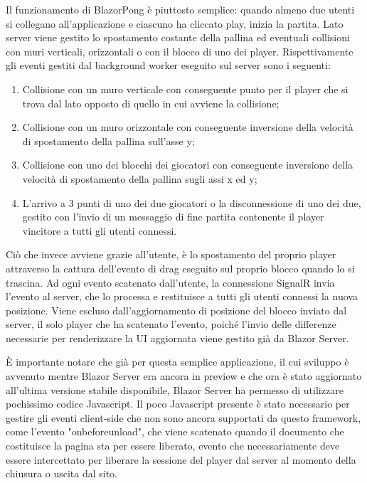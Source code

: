 Il funzionamento di BlazorPong \`e piuttosto semplice: quando almeno due utenti si collegano all'applicazione e ciascuno ha cliccato play, inizia la partita.
Lato server viene gestito lo spostamento costante della pallina ed eventuali collisioni con muri verticali, orizzontali o con il blocco di uno dei player.
Rispettivamente gli eventi gestiti dal background worker eseguito sul server sono i seguenti:
\begin{enumerate}
	\item Collisione con un muro verticale con conseguente punto per il player che si trova dal lato opposto di quello in cui avviene la collisione;
	\item Collisione con un muro orizzontale con conseguente inversione della velocit\`a di spostamento della pallina sull'asse y;
	\item Collisione con uno dei blocchi dei giocatori con conseguente inversione della velocit\`a di spostamento della pallina sugli assi x ed y;
	\item L'arrivo a 3 punti di uno dei due giocatori o la disconnessione di uno dei due, gestito con l'invio di un messaggio di fine partita contenente il player vincitore a tutti gli utenti connessi.
\end{enumerate}

Ci\`o che invece avviene grazie all'utente, \`e lo spostamento del proprio player attraverso la cattura dell'evento di drag eseguito sul proprio blocco quando lo si trascina.
Ad ogni evento scatenato dall'utente, la connessione SignalR invia l'evento al server, che lo processa e restituisce a tutti gli utenti connessi la nuova posizione.
Viene escluso dall'aggiornamento di posizione del blocco inviato dal server, il solo player che ha scatenato l'evento, poich\'e l'invio delle differenze necessarie per renderizzare la UI aggiornata viene gestito gi\`a da Blazor Server.

\`E importante notare che gi\`a per questa semplice applicazione, il cui sviluppo \`e avvenuto mentre Blazor Server era ancora in preview e che ora \`e stato aggiornato all'ultima versione stabile disponibile, Blazor Server ha permesso di utilizzare pochissimo codice Javascript.
Il poco Javascript presente \`e stato necessario per gestire gli eventi client-side che non sono ancora supportati da questo framework, come l'evento "onbeforeunload", che viene scatenato quando il documento che costituisce la pagina sta per essere liberato, evento che necessariamente deve essere intercettato per liberare la sessione del player dal server al momento della chiusura o uscita dal sito.

